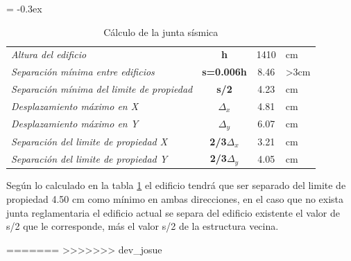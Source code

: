 \documentclass{article}%
\begin{document}
%


\begin{table}[ht!]%
\centering%
\caption{Cálculo de la junta sísmica}%
\extrarowheight = -0.3ex%
\renewcommand{\arraystretch}{1.5}%
\begin{tabular}{l|c|c|l}%
\cline{2-3}%
\textit{Altura del edificio} & \textbf{h} & {1410} & {cm} \\%
\cline{2-3}%
\textit{Separación mínima entre edificios} & \textbf{s=0.006h} & {8.46} & {>3cm} \\%
\cline{2-3}%
\textit{Separación mínima del limite de propiedad} & \textbf{s/2} & {4.23} & {cm} \\%
\cline{2-3}%
\textit{Desplazamiento máximo en X} & \textbf{$\Delta_x$} & {4.81} & {cm} \\%
\cline{2-3}%
\textit{Desplazamiento máximo en Y} & \textbf{$\Delta_y$} & {6.07} & {cm} \\%
\cline{2-3}%
\textit{Separación del limite de propiedad X} & \textbf{2/3$\Delta_{x}$} & {3.21} & {cm} \\%
\cline{2-3}%
\textit{Separación del limite de propiedad Y} & \textbf{2/3$\Delta_{y}$} & {4.05} & {cm} \\%
\cline{2-3}%
\end{tabular}%
\label{tab:junta_sis}%
\end{table}

%
Según lo calculado en la tabla \ref{tab:junta_sis} %
 el edificio tendrá que ser separado del limite de propiedad 4.50 cm como mínimo en ambas direcciones, en el caso que no exista junta reglamentaria el edificio actual se separa del edificio existente el valor de s/2 que le corresponde, más el valor s/2 de la estructura vecina.

%
=======
>>>>>>> dev_josue
\end{document}
